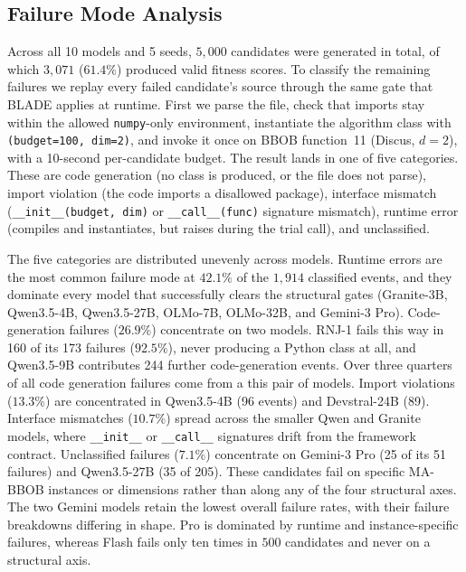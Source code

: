 \subsection{Failure Mode Analysis}
\label{sec:results-failures}


Across all 10 models and 5 seeds, $5{,}000$ candidates were generated in total, of which $3{,}071$ ($61.4\%$) produced valid fitness scores. To classify the remaining failures we replay every failed candidate's source through the same gate that BLADE applies at runtime. First we parse the file, check that imports stay within the allowed \texttt{numpy}-only environment, instantiate the algorithm class with \texttt{(budget=100, dim=2)}, and invoke it once on BBOB function~11 (Discus, $d = 2$), with a 10-second per-candidate budget. The result lands in one of five categories. These are code generation (no class is produced, or the file does not parse), import violation (the code imports a disallowed package), interface mismatch (\texttt{\_\_init\_\_(budget, dim)} or \texttt{\_\_call\_\_(func)} signature mismatch), runtime error (compiles and instantiates, but raises during the trial call), and unclassified.

The five categories are distributed unevenly across models. Runtime errors are the most common failure mode at $42.1\%$ of the $1{,}914$ classified events, and they dominate every model that successfully clears the structural gates (Granite-3B, Qwen3.5-4B, Qwen3.5-27B, OLMo-7B, OLMo-32B, and Gemini-3 Pro). Code-generation failures ($26.9\%$) concentrate on two models. RNJ-1 fails this way in 160 of its 173 failures ($92.5\%$), never producing a Python class at all, and Qwen3.5-9B contributes 244 further code-generation events. Over three quarters of all code generation failures come from a this pair of models. Import violations ($13.3\%$) are concentrated in Qwen3.5-4B (96 events) and Devstral-24B (89). Interface mismatches ($10.7\%$) spread across the smaller Qwen and Granite models, where \texttt{\_\_init\_\_} or \texttt{\_\_call\_\_} signatures drift from the framework contract. Unclassified failures ($7.1\%$) concentrate on Gemini-3 Pro (25 of its 51 failures) and Qwen3.5-27B (35 of 205). These candidates fail on specific MA-BBOB instances or dimensions rather than along any of the four structural axes. The two Gemini models retain the lowest overall failure rates, with their failure breakdowns differing in shape. Pro is dominated by runtime and instance-specific failures, whereas Flash fails only ten times in $500$ candidates and never on a structural axis.


